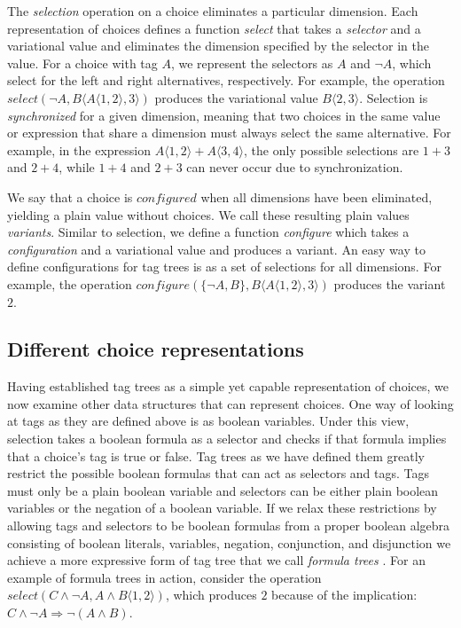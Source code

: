 \documentclass[letterpaper,10pt,onecolumn]{article}
\newcommand{\tagtree}[3]{#1 \langle #2, #3 \rangle}
\begin{document}
The \emph{selection} operation on a choice eliminates a particular dimension. Each representation
of choices defines a function \emph{select} that takes a \emph{selector} and a variational value and
eliminates the dimension specified by the selector in the value. For a choice with tag $A$, we represent the
selectors as $A$ and $\neg A$, which select for the left and right alternatives, respectively.
For example, the operation $select(\neg A, \tagtree{B}{\tagtree{A}{1}{2}}{3})$ produces the
variational value $\tagtree{B}{2}{3}$. Selection is \emph{synchronized} for a given
dimension, meaning that two choices in the same value or expression that share a dimension must always
select the same alternative. For example, in the expression $\tagtree{A}{1}{2}+\tagtree{A}{3}{4}$,
the only possible selections are $1+3$ and $2+4$, while $1+4$ and $2+3$ can never occur due
to synchronization.

We say that a choice is $configured$ when all dimensions
have been eliminated, yielding a plain value without choices. We call these resulting plain values
\emph{variants}. Similar to selection, we define a function \emph{configure} which takes a
\emph{configuration} and a variational value and produces a variant. An easy way to define
configurations for tag trees is as a set of selections for all dimensions. For example, the operation
$configure(\{\neg A,B\}, \tagtree{B}{\tagtree{A}{1}{2}}{3})$ produces the variant $2$.

\subsection{Different choice representations}

Having established tag trees as a simple yet capable representation of choices, we now
examine other data structures that can represent choices. One way of looking at tags
as they are defined above is as boolean variables. Under this view, selection takes a boolean
formula as a selector and checks if that formula implies that a choice's tag is true or false.
Tag trees as we have defined them greatly restrict the possible boolean formulas that can act
as selectors and tags. Tags must only be a plain boolean variable and selectors can be either
plain boolean variables or the negation of a boolean variable. If we relax these restrictions by
allowing tags and selectors to be boolean formulas from a proper boolean algebra
consisting of boolean literals, variables, negation, conjunction, and disjunction we achieve a
more expressive form of tag tree that we call \emph{formula trees} \cite{walkingshaw2014projectional,walkingshaw2014variational}.
For an example of formula
trees in action, consider the operation $select(C \wedge \neg A , A \wedge B \langle 1, 2 \rangle)$,
which produces $2$ because of the implication: $C \wedge \neg A \Rightarrow \neg(A \wedge B)$.
\end{document}

